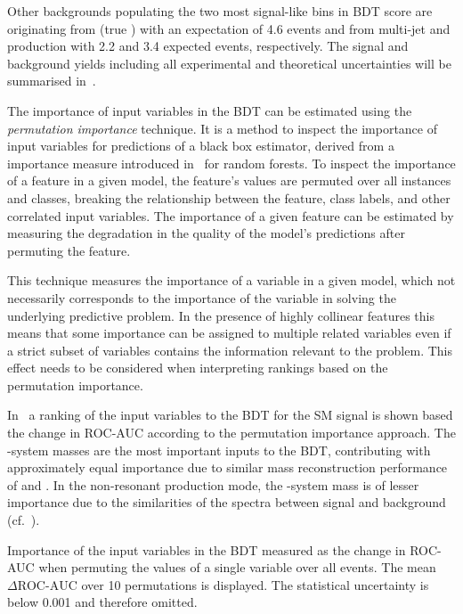 Other backgrounds populating the two most signal-like bins in BDT
score are originating from \ttbar (true \tauhadvis) with an
expectation of 4.6 events and \jettotauhadvis from multi-jet and
\ttbar production with 2.2 and 3.4 expected events, respectively. The
signal and background yields including all experimental and
theoretical uncertainties will be summarised
in~.

The importance of input variables in the BDT can be estimated using
the \emph{permutation importance} technique. It is a method to inspect
the importance of input variables for predictions of a black box
estimator, derived from a importance measure introduced
in~\cite{breiman01} for random forests. To inspect the importance of a
feature in a given model, the feature's values are permuted over all
instances and classes, breaking the relationship between the feature,
class labels, and other correlated input variables. The importance of
a given feature can be estimated by measuring the degradation in the
quality of the model's predictions after permuting the feature.

This technique measures the importance of a variable in a given model,
which not necessarily corresponds to the importance of the variable in
solving the underlying predictive problem. In the presence of highly
collinear features this means that some importance can be assigned to
multiple related variables even if a strict subset of variables
contains the information relevant to the problem. This effect needs to
be considered when interpreting rankings based on the permutation
importance.

In~ a ranking of the input variables
to the BDT for the SM \HH signal is shown based the change in ROC-AUC
according to the permutation importance approach. The \PHiggs-system
masses are the most important inputs to the BDT, contributing with
approximately equal importance due to similar mass reconstruction
performance of \mMMC and \mBB. In the non-resonant production mode,
the \HH-system mass is of lesser importance due to the similarities of
the \mHH spectra between signal and background
(cf.~).

\begin{table}[htbp]
  \centering

  

  \caption{Importance of the input variables in the BDT measured as
    the change in ROC-AUC when permuting the values of a single
    variable over all events. The mean $\Delta\text{ROC-AUC}$ over 10
    permutations is displayed. The statistical uncertainty is below
    0.001 and therefore omitted.}
  \label{tab:variable_importance_bdt}
\end{table}


